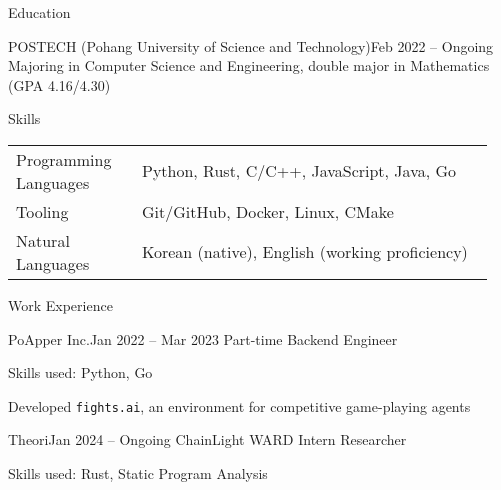 \documentclass{resume}
\begin{document}
\begin{res-section}{Education}
  \begin{res-subsection}{POSTECH (Pohang University of Science and Technology)}{Feb 2022 -- Ongoing}
    Majoring in Computer Science and Engineering, double major in Mathematics (GPA 4.16/4.30)
  \end{res-subsection}
\end{res-section}

\begin{res-section}{Skills}
  \begin{tabular}{p{0.25\linewidth}p{0.7\linewidth}}
    Programming Languages
      & Python, Rust, C/C++, JavaScript, Java, Go \\
    Tooling
      & Git/GitHub, Docker, Linux, CMake \\
    Natural Languages
      & Korean (native), English (working proficiency)
  \end{tabular}
\end{res-section}

\begin{res-section}{Work Experience}
  \begin{res-subsection}{PoApper Inc.}{Jan 2022 -- Mar 2023}
    Part-time Backend Engineer

    \item Skills used: Python, Go

    \item Developed \texttt{fights.ai}, an environment for competitive game-playing agents
  \end{res-subsection}

  \begin{res-subsection}{Theori}{Jan 2024 -- Ongoing}
    ChainLight WARD Intern Researcher

    \item Skills used: Rust, Static Program Analysis
  \end{res-subsection}
\end{res-section}
\end{document}
